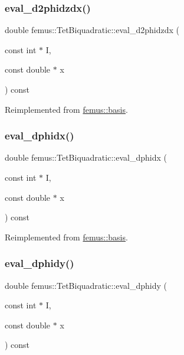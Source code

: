 \subsubsection{\texorpdfstring{eval\+\_\+d2phidzdx()}{eval\_d2phidzdx()}}
{\footnotesize\ttfamily double femus\+::\+Tet\+Biquadratic\+::eval\+\_\+d2phidzdx (\begin{DoxyParamCaption}\item[{const int $\ast$}]{I,  }\item[{const double $\ast$}]{x }\end{DoxyParamCaption}) const\hspace{0.3cm}{\ttfamily [virtual]}}



Reimplemented from \mbox{\hyperlink{classfemus_1_1basis_a5d619ec5bd57b7d2dc34a99d69975c77}{femus\+::basis}}.

\mbox{\label{classfemus_1_1_tet_biquadratic_afd1125cd520a11a911a596785b75ce4d}} 
\subsubsection{\texorpdfstring{eval\+\_\+dphidx()}{eval\_dphidx()}}
{\footnotesize\ttfamily double femus\+::\+Tet\+Biquadratic\+::eval\+\_\+dphidx (\begin{DoxyParamCaption}\item[{const int $\ast$}]{I,  }\item[{const double $\ast$}]{x }\end{DoxyParamCaption}) const\hspace{0.3cm}{\ttfamily [virtual]}}



Reimplemented from \mbox{\hyperlink{classfemus_1_1basis_a4db7d29cf8a753ddbccc4a297dafa0bf}{femus\+::basis}}.

\mbox{\label{classfemus_1_1_tet_biquadratic_a00d710cd64c43aab218a91dced7436c8}} 
\subsubsection{\texorpdfstring{eval\+\_\+dphidy()}{eval\_dphidy()}}
{\footnotesize\ttfamily double femus\+::\+Tet\+Biquadratic\+::eval\+\_\+dphidy (\begin{DoxyParamCaption}\item[{const int $\ast$}]{I,  }\item[{const double $\ast$}]{x }\end{DoxyParamCaption}) const\hspace{0.3cm}{\ttfamily [virtual]}}



